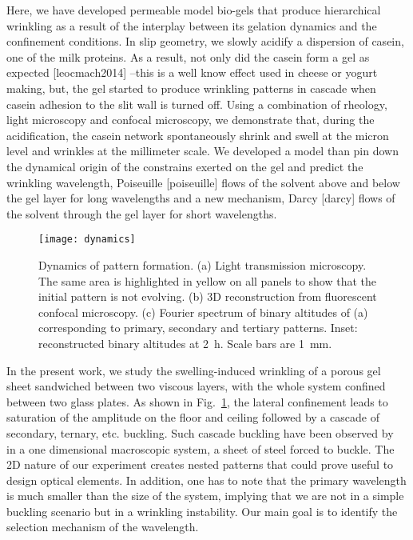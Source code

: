 \documentclass[twocolumn,superscriptaddress,showpacs,preprintnumbers,
amsmath,amssymb,prl]{revtex4-1}
\begin{document}
Here, we have developed permeable model bio-gels that produce hierarchical wrinkling as a result of the interplay between its gelation dynamics and the confinement conditions. In slip geometry, we slowly acidify a dispersion of casein, one of the milk proteins.  As a result, not only did the casein form a gel as expected [leocmach2014] --this is a well know effect used in cheese or yogurt making, but, the gel started to produce wrinkling patterns in cascade when casein adhesion to the slit wall is turned off. Using a combination of rheology, light microscopy and confocal microscopy, we demonstrate that, during the acidification, the casein network spontaneously shrink and swell at the micron level and wrinkles at the millimeter scale. We developed a model than pin down the dynamical origin of the constrains exerted on the gel and predict the wrinkling wavelength, Poiseuille [poiseuille] flows of the solvent above and below the gel layer for long wavelengths and a new mechanism, Darcy [darcy] flows of the solvent through the gel layer for short wavelengths.

\begin{figure}
	\texttt{[image: dynamics]}
	\caption{Dynamics of pattern formation. (a) Light transmission microscopy. The same area is highlighted in yellow on all panels to show that the initial pattern is not evolving. (b) 3D reconstruction from fluorescent confocal microscopy. (c) Fourier spectrum of binary altitudes of (a) corresponding to primary, secondary and tertiary patterns. Inset: reconstructed binary altitudes at \SI{2}{\hour}. Scale bars are \SI{1}{\milli\metre}.}
	\label{fig:dynamics}
\end{figure}

In the present work, we study the swelling-induced wrinkling of a porous gel sheet sandwiched between two viscous layers, with the whole system confined between two glass plates. As shown in Fig.~\ref{fig:dynamics}, the lateral confinement leads to saturation of the amplitude on the floor and ceiling followed by a cascade of secondary, ternary, etc. buckling. Such cascade buckling have been observed by~\cite{Roman1999} in a one dimensional macroscopic system, a sheet of steel forced to buckle. The 2D nature of our experiment creates nested patterns that could prove useful to design optical elements. In addition, one has to note that the primary wavelength is much smaller than the size of the system, implying that we are not in a simple buckling scenario but in a wrinkling instability. Our main goal is to identify the selection mechanism of the wavelength.
\end{document}
